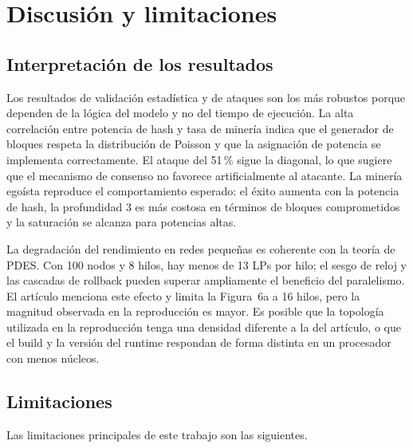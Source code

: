 \documentclass[11pt,a4paper,oneside]{article}
\begin{document}
\section{Discusión y limitaciones}
\label{sec:discusion}

\subsection{Interpretación de los resultados}

Los resultados de validación estadística y de ataques son los más robustos porque dependen de la lógica del modelo y no del tiempo de ejecución. La alta correlación entre potencia de hash y tasa de minería indica que el generador de bloques respeta la distribución de Poisson y que la asignación de potencia se implementa correctamente. El ataque del 51\,\% sigue la diagonal, lo que sugiere que el mecanismo de consenso no favorece artificialmente al atacante. La minería egoísta reproduce el comportamiento esperado: el éxito aumenta con la potencia de hash, la profundidad 3 es más costosa en términos de bloques comprometidos y la saturación se alcanza para potencias altas.

La degradación del rendimiento en redes pequeñas es coherente con la teoría de PDES. Con 100 nodos y 8 hilos, hay menos de 13 LPs por hilo; el sesgo de reloj y las cascadas de rollback pueden superar ampliamente el beneficio del paralelismo. El artículo menciona este efecto y limita la Figura~6a a 16 hilos, pero la magnitud observada en la reproducción es mayor. Es posible que la topología utilizada en la reproducción tenga una densidad diferente a la del artículo, o que el build y la versión del runtime respondan de forma distinta en un procesador con menos núcleos.

\subsection{Limitaciones}

Las limitaciones principales de este trabajo son las siguientes.
\end{document}
